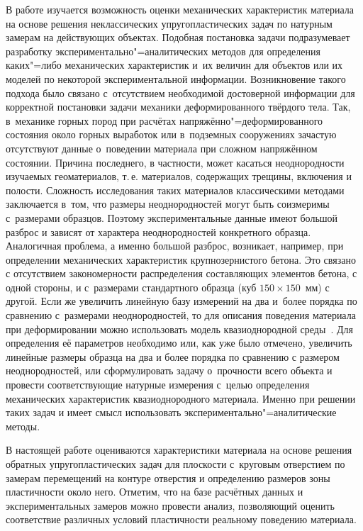В работе изучается возможность оценки механических характеристик материала на основе решения неклассических упругопластических задач по натурным замерам на действующих объектах. 
Подобная постановка задачи подразумевает разработку экспериментально"=аналитических методов для определения каких"=либо механических характеристик и~их величин для объектов или их моделей по некоторой экспериментальной информации.
Возникновение такого подхода было связано с~отсутствием необходимой достоверной информации для корректной постановки задачи
механики деформированного твёрдого тела. 
Так, в~механике горных пород при расчётах напряжённо"=деформированного состояния около горных выработок или в~подземных
сооружениях зачастую отсутствуют данные о~поведении материала при сложном напряжённом состоянии. 
Причина последнего, в частности, может касаться неоднородности изучаемых геоматериалов, т.\,е. материалов, содержащих трещины,
включения и полости. 
Сложность исследования таких материалов классическими методами заключается в~том, что размеры неоднородностей могут быть соизмеримы с~размерами образцов. 
Поэтому экспериментальные данные имеют большой разброс и зависят от характера неоднородностей конкретного образца. 
Аналогичная проблема, а именно большой разброс, возникает, например, при определении механических характеристик крупнозернистого бетона. 
Это связано с отсутствием закономерности распределения составляющих элементов бетона, с одной стороны, и с~размерами стандартного образца (куб $150 \times 150$~мм) с другой.
Если же увеличить линейную базу измерений на два и~более порядка по сравнению с~размерами неоднородностей, то для описания поведения материала при деформировании можно использовать модель  квазиоднородной среды~\cite{shvab:bib1}. 
Для определения её параметров необходимо или, как уже было отмечено, увеличить линейные размеры образца на два и более порядка по сравнению с размером неоднородностей, или сформулировать задачу о~прочности всего объекта и провести соответствующие натурные измерения с~целью определения механических характеристик квазиоднородного материала. 
Именно при решении таких задач и  имеет смысл использовать экспериментально"=аналитические методы.

В настоящей работе оцениваются характеристики материала на основе решения обратных упругопластических задач для плоскости с~круговым отверстием  по замерам перемещений на контуре отверстия и определению размеров зоны пластичности около него. 
Отметим, что на базе расчётных данных и экспериментальных замеров можно провести анализ, позволяющий оценить соответствие различных условий пластичности реальному поведению материала. 

